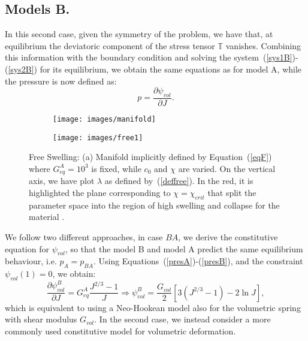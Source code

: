\subsection{Models B.}
In this second case, given the symmetry of the problem, we have that, at equilibrium the deviatoric component of the stress tensor $\mathbb{T}$ vanishes. Combining this information with the boundary condition and solving the system~(\ref{sys1B})-(\ref{sys2B}) for its equilibrium, we obtain the same equations as for model A, while the pressure is now defined as:
\begin{equation}
p = \frac{\partial \psi_{vol}}{\partial J} .\label{presB}%
\end{equation}

\begin{figure}[h!]
	\begin{subfigure}{0.53\textwidth}
		\texttt{[image: images/manifold]}
		\caption{}
	\end{subfigure}
	\hspace{-5mm}
	\begin{subfigure}{0.46\textwidth}
		\hspace{-3mm}
		\texttt{[image: images/free1]}
		\caption{}
	\end{subfigure}
	\caption{Free Swelling: (a) Manifold implicitly defined by Equation~(\ref{eqF}) where $G^A_{eq}=10^3$ is fixed, while $c_0$ and $\chi$ are varied. On the vertical axis, we have plot $\lambda$ as defined by~(\ref{deffree}). In the red, it is highlighted the plane corresponding to $\chi=\chi_{crit}$ that split the parameter space into the region of high swelling and collapse for the material \cite{}.}
\end{figure}

We follow two different approaches, in case $BA$, we derive the constitutive equation for $\psi_{vol}$, so that the model B and model A predict the same equilibrium behaviour, i.e. $p_A=p_{BA}$. Using Equations~(\ref{presA})-(\ref{presB}), and the constraint $\psi_{vol}(1)=0$, we obtain:
\begin{equation}
\frac{\partial \psi^{B}_{vol}}{\partial J}= G^A_{eq} \frac{J^{2/3}-1}{J} \Longrightarrow \psi^B_{vol} = \frac{G_{vol}}{2}\left[3(J^{2/3} -1) - 2\ln J\right],
\end{equation}
which is equivalent to using a Neo-Hookean model also for the volumetric spring with shear modulus $G_{vol}$. In the second case, we instead consider a more commonly used constitutive model for volumetric deformation. 



